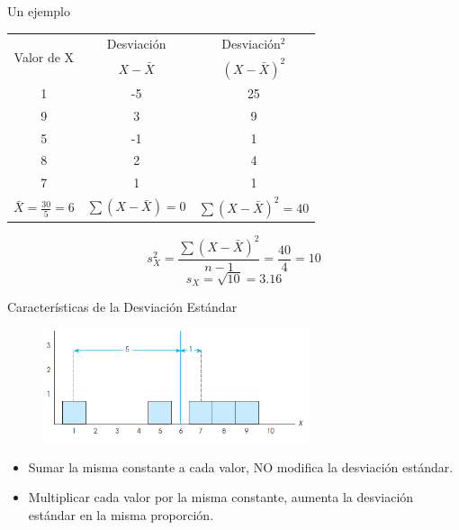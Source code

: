 \documentclass[xcolor=dvipsnames]{beamer}
\begin{document}
\begin{frame}{Un ejemplo}

\begin{center}
\begin{table}[H]
\begin{tabular}{ccc} \hline
\multirow{2}{*}{Valor de X} & Desviación & Desviación$^2$  \\
	& $X-\bar{X}$ &  $(X-\bar{X})^2$ \\ \hline
	1&-5&25 \\
	9&3&9 \\
	5&-1&1 \\
	8&2&4 \\
	7&1&1 \\ \hline
$\bar{X}=\frac{30}{5}=6$	& $\sum{(X-\bar{X})}=0$& $\sum{(X-\bar{X})^2}=40$
	
\end{tabular}
\end{table}
\end{center}
$$s_X^2=\dfrac{\sum{(X-\bar{X})^2}}{n-1}=\frac{40}{4}=10$$
$$s_X=\sqrt{10}=3.16$$
\end{frame}

\begin{frame}{Características de la Desviación Estándar}
	\begin{figure}[H]
		\centering  
		\caption{ } 
		\includegraphics[width = 0.7\textwidth]{./cap1}
	\end{figure}
	\begin{itemize}
		\justifying
		\item Sumar la misma constante a cada valor, NO modifica la desviación estándar.
		\item Multiplicar cada valor por la misma constante, aumenta la desviación estándar en la misma proporción.
	\end{itemize}
\end{frame}
\end{document}

